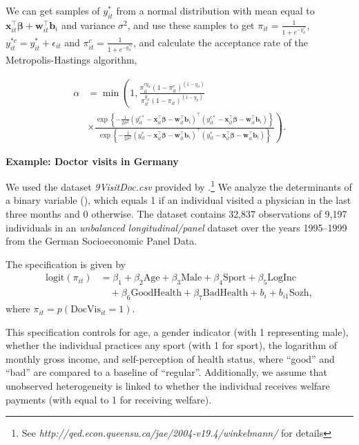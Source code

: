 We can get samples of $y_{it}^*$ from a normal distribution with mean equal to $\bm{x}_{it}^{\top}\bm{\beta}+\bm{w}_{it}^{\top}\bm{b}_i$ and variance $\sigma^2$, and use these samples to get $\pi_{it}=\frac{1}{1+e^{-y_{it}^*}}$, $y_{it}^{*c}=y_{it}^{*}+\epsilon_{it}$ and $\pi_{it}^c=\frac{1}{1+e^{-y_{it}^{*c}}}$, and calculate the acceptance rate of the Metropolis-Hastings algorithm, 

\begin{align*}
	\alpha&=\min\left(1,\frac{ \pi_{it}^{cy_{it}}(1-\pi_{it}^c)^{(1-y_{it})}}{\pi_{it}^{y_{it}}(1-\pi_{it})^{(1-y_{it})}}\right.\\
	&\times \left. \frac{\exp\left\{-\frac{1}{2\sigma^2}(y_{it}^{c*}-\bm{x}_{it}^{\top}\bm{\beta}-\bm{w}_{it}^{\top}\bm{b}_i)^{\top}(y_{it}^{c*}-\bm{x}_{it}^{\top}\bm{\beta}-\bm{w}_{it}^{\top}\bm{b}_i)\right\}}{\exp\left\{-\frac{1}{2\sigma^2}(y_{it}^{*}-\bm{x}_{it}^{\top}\bm{\beta}-\bm{w}_{it}^{\top}\bm{b}_i)^{\top}(y_{it}^{*}-\bm{x}_{it}^{\top}\bm{\beta}-\bm{w}_{it}^{\top}\bm{b}_i)\right\}}\right).
\end{align*}


\textbf{Example: Doctor visits in Germany}

We used the dataset \textit{9VisitDoc.csv} provided by \cite{Winkelmann2004}.\footnote{See \textit{http://qed.econ.queensu.ca/jae/2004-v19.4/winkelmann/} for details} We analyze the determinants of a binary variable (), which equals 1 if an individual visited a physician in the last three months and 0 otherwise. The dataset contains 32,837 observations of 9,197 individuals in an \textit{unbalanced longitudinal/panel} dataset over the years 1995--1999 from the German Socioeconomic Panel Data.

The specification is given by
\begin{align*}
	\text{logit}(\pi_{it}) &= \beta_1 + \beta_2 \text{Age} + \beta_3 \text{Male} + \beta_4 \text{Sport} + \beta_5 \text{LogInc} \\
	&\quad + \beta_6 \text{GoodHealth} + \beta_7 \text{BadHealth} + b_i + b_{i1} \text{Sozh},
\end{align*}
where $\pi_{it} = p(\text{DocVis}_{it} = 1)$.

This specification controls for age, a gender indicator (with 1 representing male), whether the individual practices any sport (with 1 for sport), the logarithm of monthly gross income, and self-perception of health status, where “good” and “bad” are compared to a baseline of “regular”. Additionally, we assume that unobserved heterogeneity is linked to whether the individual receives welfare payments (with  equal to 1 for receiving welfare). 

